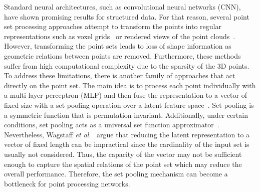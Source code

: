 \documentclass{ieeeaccess}
\begin{document}
Standard neural architectures, such as convolutional neural networks (CNN), have shown promising results for structured data. For that reason, several point set processing approaches attempt to transform the points into regular representations such as voxel grids~\cite{maturana2015voxnet,wu20153d} or rendered views of the point clouds~\cite{qi2016volumetric,su2015multi}. However, transforming the point sets leads to loss of shape information as geometric relations between points are removed. Furthermore, these methods suffer from high computational complexity due to the sparsity of the 3D points. 
To address these limitations, there is another family of approaches that act directly on the point set. The main idea is to process each point individually with a multi-layer perceptron (MLP) and then fuse the representation to a vector of fixed size with a set pooling operation over a latent feature space~\cite{qi2017pointnet,qi2017pointnet++}.
Set pooling is a symmetric function that is permutation invariant. Additionally, under certain conditions, set pooling acts as a universal set function approximator~\cite{zaheer2017deep}. 
Nevertheless, Wagstaff \textit{et al}.~\cite{wagstaff2019limitations} argue that reducing the latent representation to a vector of fixed length can be impractical since the cardinality of the input set is usually not considered. Thus, the capacity of the vector may not be sufficient enough to capture the spatial relations of the point set which may reduce the overall performance. Therefore, the set pooling mechanism can become a bottleneck for point processing networks. 
\end{document}
